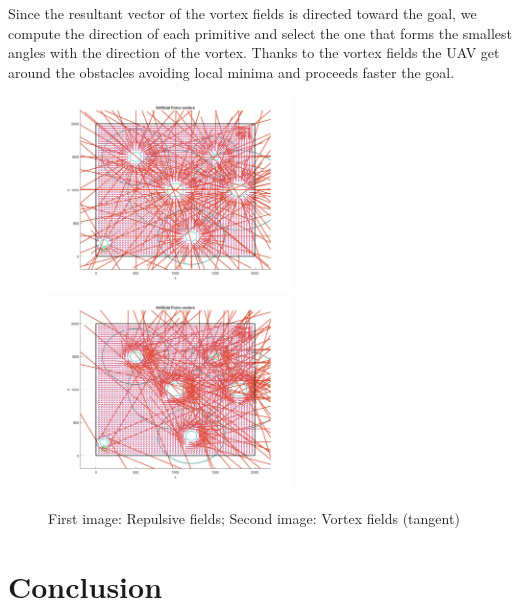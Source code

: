 \documentclass[oneside,onecolumn]{article}
\begin{document}
Since the resultant vector of the vortex fields is directed toward the goal, we compute the direction of each primitive and select the one that forms the smallest angles with the direction of the vortex. Thanks to the vortex fields the UAV get around the obstacles avoiding local minima and proceeds faster the goal.
\begin{figure}[htbp]
	\centering
	\includegraphics[width=6.5cm]{images/c}%
	\qquad\qquad
	\includegraphics[width=6.5cm]{images/d}\label{fig:4}
	\caption{First image: Repulsive fields; Second image: Vortex fields (tangent)}
\end{figure}




\section{Conclusion}

\end{document}
